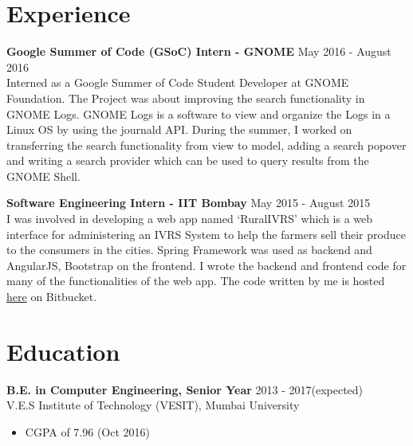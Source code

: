 \documentclass[12pt,margin, centered]{res}
\begin{document}
\begin{resume}



\section{Experience}
\vspace{10mm}
\textbf{Google Summer of Code (GSoC) Intern - GNOME} \hfill May 2016 - August 2016\\
Interned as a Google Summer of Code Student Developer at GNOME Foundation. The Project was about improving the search functionality in GNOME Logs. GNOME Logs is a software to view and organize the Logs in a Linux OS by using the journald API. During the summer, I worked on transferring the search functionality from view to model, adding a search popover and writing a search provider which can be used to query results from the GNOME Shell.

\vspace{2mm}

\textbf{Software Engineering Intern - IIT Bombay} \hfill May 2015 - August 2015\\
I was involved in developing a web app named ‘RuralIVRS’ which is a web interface for administering an IVRS System to help the farmers sell their produce to the consumers in the cities. Spring Framework was used as backend and AngularJS, Bootstrap on the frontend. I wrote the backend and frontend code for many of the functionalities of the web app. The code written by me is hosted \href{https://bitbucket.org/pranavg189/ruralict}{here} on Bitbucket.



\section{Education}
\vspace{10mm}
\textbf{B.E. in Computer Engineering, Senior Year} \hfill 2013 - 2017(expected) \\
V.E.S Institute of Technology (VESIT), Mumbai University
\begin{itemize}
 \item CGPA of 7.96 (Oct 2016)
\end{itemize}


\end{resume}
\end{document}
